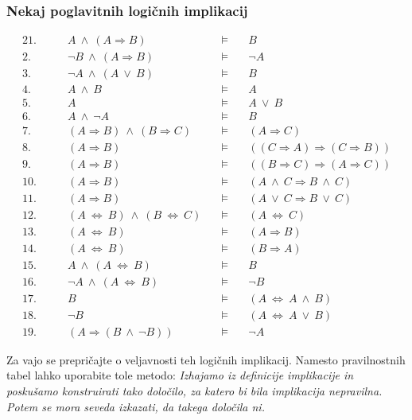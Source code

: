 \documentclass[11pt,paper=b5,DIV=13,headinclude,footinclude]{scrbook}
\def\ali {{~\vee~}}
\def\inn {{~\wedge~}}
\def\cee {{~\Leftrightarrow~}}
\begin{document}
\subsubsection*{Nekaj poglavitnih logičnih implikacij}

\begin{alignat*}{2}
  \text{1.}\qquad & A \inn (A \Rightarrow B) &\quad\vDash\quad & B \\
  \text{2.}\qquad & \neg B \inn (A \Rightarrow B) &\quad\vDash\quad & \neg A \\
  \text{3.}\qquad & \neg A \inn (A \ali B) &\quad\vDash\quad & B \\
  \text{4.}\qquad & A \inn B &\quad\vDash\quad & A \\
  \text{5.}\qquad & A &\quad\vDash\quad & A\ali B \\
  \text{6.}\qquad & A \inn \neg A &\quad\vDash\quad & B \\
  \text{7.}\qquad & (A \Rightarrow B) \inn (B \Rightarrow C) &\quad\vDash\quad & (A\Rightarrow C) \\
  \text{8.}\qquad & (A \Rightarrow B) &\quad\vDash\quad & ((C \Rightarrow A) \Rightarrow (C\Rightarrow B)) \\
  \text{9.}\qquad & (A \Rightarrow B) &\quad\vDash\quad & ((B \Rightarrow C) \Rightarrow (A\Rightarrow C)) \\
  \text{10.}\qquad & (A \Rightarrow B) &\quad\vDash\quad & (A\inn C \Rightarrow B\inn C) \\
  \text{11.}\qquad & (A \Rightarrow B) &\quad\vDash\quad & (A\ali C \Rightarrow B\ali C) \\
  \text{12.}\qquad & (A \cee B) \inn (B\cee C) &\quad\vDash\quad & (A\cee C) \\
  \text{13.}\qquad & (A \cee B) &\quad\vDash\quad & (A\Rightarrow B) \\
  \text{14.}\qquad & (A \cee B) &\quad\vDash\quad & (B\Rightarrow A) \\
  \text{15.}\qquad & A \inn (A \cee B) &\quad\vDash\quad & B \\
  \text{16.}\qquad & \neg A \inn (A \cee B) &\quad\vDash\quad & \neg B \\
  \text{17.}\qquad & B &\quad\vDash\quad & (A\cee A \inn B) \\
  \text{18.}\qquad & \neg B &\quad\vDash\quad & (A\cee A \ali B) \\
  \text{19.}\qquad & (A \Rightarrow (B\inn \neg B)) &\quad\vDash\quad & \neg A
\end{alignat*}

Za vajo se prepričajte o veljavnosti teh logičnih implikacij. Namesto pravilnostnih tabel lahko uporabite tole metodo:  {\em Izhajamo iz definicije implikacije in poskušamo konstruirati tako določilo, za katero bi bila implikacija nepravilna. Potem se mora seveda izkazati, da takega določila ni.}
\end{document}
